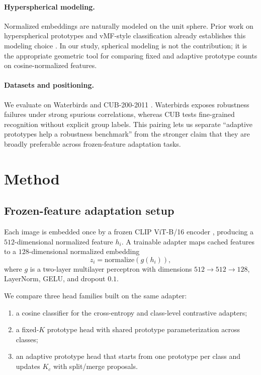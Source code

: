 \documentclass[10pt,twocolumn]{article}
\begin{document}
\paragraph{Hyperspherical modeling.}
Normalized embeddings are naturally modeled on the unit sphere. Prior work on hyperspherical prototypes and vMF-style classification already establishes this modeling choice \citep{mettes2019Hyperspherical,wang2022Towards}. In our study, spherical modeling is not the contribution; it is the appropriate geometric tool for comparing fixed and adaptive prototype counts on cosine-normalized features.

\paragraph{Datasets and positioning.}
We evaluate on Waterbirds and CUB-200-2011 \citep{koh2021wilds,wah2011caltech}. Waterbirds exposes robustness failures under strong spurious correlations, whereas CUB tests fine-grained recognition without explicit group labels. This pairing lets us separate ``adaptive prototypes help a robustness benchmark'' from the stronger claim that they are broadly preferable across frozen-feature adaptation tasks.

\section{Method}
\label{sec:method}
\subsection{Frozen-feature adaptation setup}
Each image is embedded once by a frozen CLIP ViT-B/16 encoder \citep{radford2021Learning}, producing a $512$-dimensional normalized feature $h_i$. A trainable adapter maps cached features to a $128$-dimensional normalized embedding
\begin{equation}
z_i = \mathrm{normalize}(g(h_i)),
\end{equation}
where $g$ is a two-layer multilayer perceptron with dimensions $512 \rightarrow 512 \rightarrow 128$, LayerNorm, GELU, and dropout $0.1$.

We compare three head families built on the same adapter:
\begin{enumerate}[leftmargin=1.5em]
  \item a cosine classifier for the cross-entropy and class-level contrastive adapters;
  \item a fixed-$K$ prototype head with shared prototype parameterization across classes;
  \item an adaptive prototype head that starts from one prototype per class and updates $K_c$ with split/merge proposals.
\end{enumerate}
\end{document}
